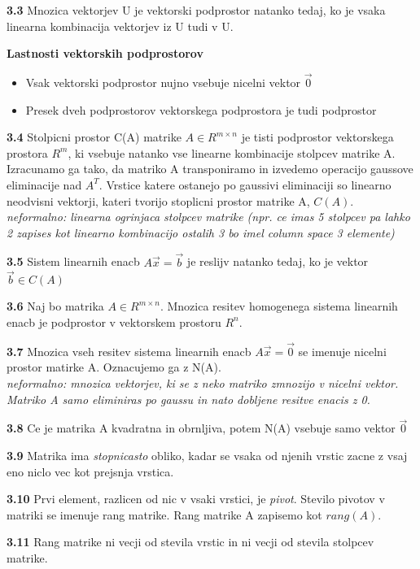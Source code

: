 \documentclass{article}
\begin{document}
\begin{multicols}{4}
\textbf{3.3} Mnozica vektorjev U je vektorski podprostor natanko tedaj, ko je vsaka linearna
kombinacija vektorjev iz U tudi v U.

\textbf{Lastnosti vektorskih podprostorov}
\begin{itemize}
    \item Vsak vektorski podprostor nujno vsebuje nicelni vektor $\vec{0}$
    \item Presek dveh podprostorov vektorskega podprostora je tudi podprostor
\end{itemize}

\textbf{3.4} Stolpicni prostor C(A) matrike $A \in R^{m \times n}$ je tisti podprostor
vektorskega prostora $R^{m}$, ki vsebuje natanko vse linearne kombinacije stolpcev matrike A.\\
Izracunamo ga tako, da matriko A transponiramo in izvedemo operacijo gaussove eliminacije nad $A^{T}$. Vrstice katere ostanejo po gaussivi eliminaciji
so linearno neodvisni vektorji, kateri tvorijo stoplicni prostor matrike A, $C(A)$.
\textit{neformalno: linearna ogrinjaca stolpcev matrike (npr. ce imas 5 stolpcev pa lahko 2 zapises kot linearno kombinacijo ostalih 3 bo imel column space 3 elemente)}

\textbf{3.5} Sistem linearnih enacb $A\vec{x} = \vec{b}$ je reslijv natanko tedaj, ko je vektor
$\vec{b} \in C(A)$

\textbf{3.6} Naj bo matrika $A \in R^{m \times n}$. Mnozica resitev homogenega sistema linearnih
enacb je podprostor v vektorskem prostoru $R^{n}$.

\textbf{3.7} Mnozica vseh resitev sistema linearnih enacb $A\vec{x} = \vec{0}$ se imenuje nicelni
prostor matirke A. Oznacujemo ga z N(A).\\
\textit{neformalno: mnozica vektorjev, ki se z neko matriko zmnozijo v nicelni vektor. Matriko A samo eliminiras po gaussu in nato dobljene resitve enacis z 0.}

\textbf{3.8} Ce je matrika A kvadratna in obrnljiva, potem N(A) vsebuje samo vektor $\vec{0}$

\textbf{3.9} Matrika ima \textit{stopnicasto} obliko, kadar se vsaka od njenih vrstic zacne z vsaj eno
niclo vec kot prejsnja vrstica.

\textbf{3.10} Prvi element, razlicen od nic v vsaki vrstici, je \textit{pivot}. Stevilo pivotov v matriki
se imenuje rang matrike. Rang matrike A zapisemo kot $rang(A)$.

\textbf{3.11} Rang matrike ni vecji od stevila vrstic in ni vecji od stevila stolpcev matrike.


\end{multicols}
\end{document}
